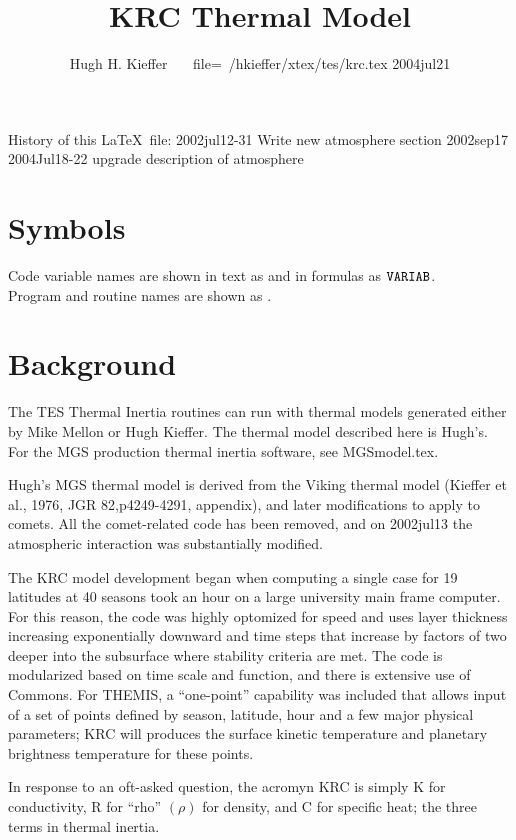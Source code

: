 \documentclass{article}
\title{KRC Thermal Model}
\author{Hugh H. Kieffer \ \ \ file=~/hkieffer/xtex/tes/krc.tex 2004jul21}
\begin{document}
\maketitle

History of this \LaTeX ~file:
\qi 2002jul12-31  Write new atmosphere section
\qi 2002sep17
\qi 2004Jul18-22 upgrade description of atmosphere

\section{Symbols}
Code variable names are shown in text as  
and in formulas as $\mathtt{VARIAB}$. 
\\ Program and routine names are shown as . 

\section{Background}

The TES Thermal Inertia routines can run with thermal models generated either by
Mike Mellon or Hugh Kieffer.  The thermal model described here is Hugh's. For
the MGS production thermal inertia software, see MGSmodel.tex.

Hugh's MGS thermal model is derived from the Viking thermal model
(Kieffer et al., 1976, JGR 82,p4249-4291, appendix), and later
modifications to apply to comets. All the comet-related code has been
removed, and on 2002jul13 the atmospheric interaction was substantially modified.

The KRC model development began when computing a single case for 19 latitudes at
40 seasons took an hour on a large university main frame computer. For this
reason, the code was highly optomized for speed and uses layer thickness
increasing exponentially downward and time steps that increase by factors of two
deeper into the subsurface where stability criteria are met. The code is
modularized based on time scale and function, and there is extensive use of
Commons. For THEMIS, a ``one-point'' capability was included that allows input
of a set of points defined by season, latitude, hour and a few major physical
parameters; KRC will produces the surface kinetic temperature and planetary
brightness temperature for these points.

In response to an oft-asked question, the acromyn KRC is simply K for
conductivity, R for ``rho'' $( \rho)$ for density, and C for specific heat; the
three terms in thermal inertia. 
\end{document}
